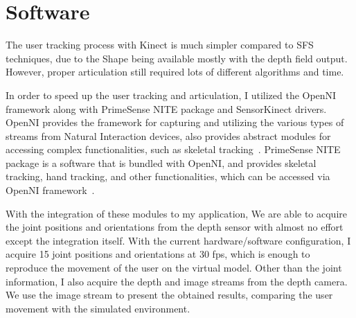 \section{Software}

The user tracking process with Kinect is much simpler compared to SFS techniques, due to the Shape being available mostly with the depth field output. However, proper articulation still required lots of different algorithms and time.

In order to speed up the user tracking and articulation, I utilized the OpenNI framework along with PrimeSense NITE package and SensorKinect drivers. OpenNI provides the framework for capturing and utilizing the various types of streams from Natural Interaction devices, also provides abstract modules for accessing complex functionalities, such as skeletal tracking~\cite{OpenNI2102}. PrimeSense NITE package is a software that is bundled with OpenNI, and provides skeletal tracking, hand tracking, and other functionalities, which can be accessed via OpenNI framework~\cite{PS2102}. 

With the integration of these modules to my application, We are able to acquire the joint positions and orientations from the depth sensor with almost no effort except the integration itself. With the current hardware/software configuration, I acquire 15 joint positions and orientations at 30 fps, which is enough to reproduce the movement of the user on the virtual model. Other than the joint information, I also acquire the depth and image streams from the depth camera. We use the image stream to present the obtained results, comparing the user movement with the simulated environment.
